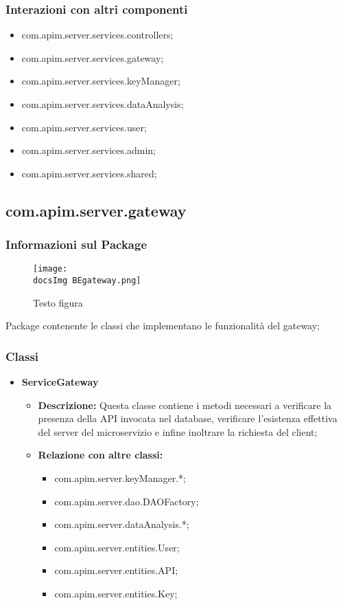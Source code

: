 {{     \subsubsection{Interazioni con altri componenti}
     \begin{itemize}
       \item com.apim.server.services.controllers;
       \item com.apim.server.services.gateway;
       \item com.apim.server.services.keyManager;
       \item com.apim.server.services.dataAnalysis;
       \item com.apim.server.services.user;
       \item com.apim.server.services.admin;
       \item com.apim.server.services.shared;
     \end{itemize}
  \subsection{com.apim.server.gateway}{
    \subsubsection{Informazioni sul Package}
      \begin{figure}[ht]
        \centering
        \texttt{[image: \\docsImg BEgateway.png]}
        \caption{Testo figura}
        \label{Testo figura}
      \end{figure}
      Package  contenente le classi che implementano le funzionalità del gateway;
      \subsubsection{Classi}
      \begin{itemize} \itemsep1pt
      \item \textbf{ServiceGateway}
      \begin{itemize}
      \item \textbf{Descrizione:} Questa classe contiene i metodi necessari a verificare la presenza della API invocata nel database, verificare l'esistenza effettiva del server del microservizio e infine inoltrare la richiesta del client;
      \item \textbf{Relazione con altre classi:}
      \begin{itemize}
      \item com.apim.server.keyManager.*;
      \item com.apim.server.dao.DAOFactory;
      \item com.apim.server.dataAnalysis.*;
      \item com.apim.server.entities.User;
      \item com.apim.server.entities.API;
      \item com.apim.server.entities.Key;
      \end{itemize}
      \end{itemize}
      \end{itemize}
}}}

